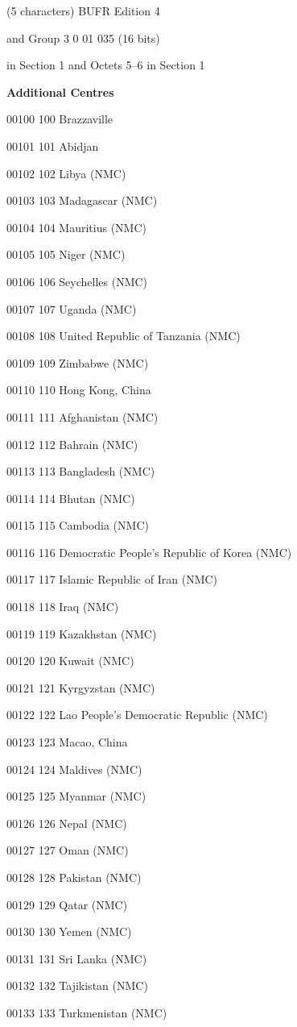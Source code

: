 (5 characters) BUFR Edition 4

and Group 3 0 01 035 (16 bits)

in Section 1 and Octets 5--6 in Section 1

\textbf{Additional Centres}

00100 100 Brazzaville

00101 101 Abidjan

00102 102 Libya (NMC)

00103 103 Madagascar (NMC)

00104 104 Mauritius (NMC)

00105 105 Niger (NMC)

00106 106 Seychelles (NMC)

00107 107 Uganda (NMC)

00108 108 United Republic of Tanzania (NMC)

00109 109 Zimbabwe (NMC)

00110 110 Hong Kong, China

00111 111 Afghanistan (NMC)

00112 112 Bahrain (NMC)

00113 113 Bangladesh (NMC)

00114 114 Bhutan (NMC)

00115 115 Cambodia (NMC)

00116 116 Democratic People's Republic of Korea (NMC)

00117 117 Islamic Republic of Iran (NMC)

00118 118 Iraq (NMC)

00119 119 Kazakhstan (NMC)

00120 120 Kuwait (NMC)

00121 121 Kyrgyzstan (NMC)

00122 122 Lao People's Democratic Republic (NMC)

00123 123 Macao, China

00124 124 Maldives (NMC)

00125 125 Myanmar (NMC)

00126 126 Nepal (NMC)

00127 127 Oman (NMC)

00128 128 Pakistan (NMC)

00129 129 Qatar (NMC)

00130 130 Yemen (NMC)

00131 131 Sri Lanka (NMC)

00132 132 Tajikistan (NMC)

00133 133 Turkmenistan (NMC)

